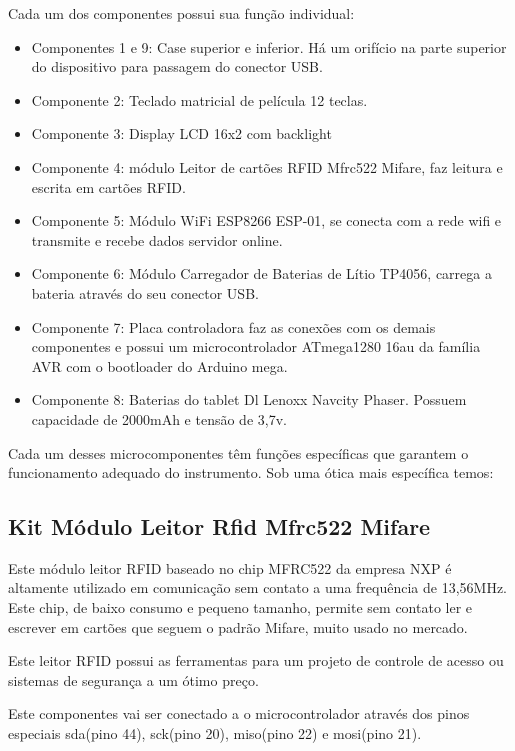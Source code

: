 Cada um dos componentes possui sua função individual:
\begin{itemize}
  \item Componentes 1 e 9: Case superior e inferior. Há um orifício na parte superior do dispositivo para passagem do conector USB.
  \item Componente 2: Teclado matricial de película 12 teclas.
  \item Componente 3: Display LCD 16x2 com backlight
  \item Componente 4: módulo Leitor de cartões RFID Mfrc522 Mifare, faz leitura e escrita em cartões RFID.
  \item Componente 5: Módulo WiFi ESP8266 ESP-01, se conecta com a rede wifi e transmite e recebe dados servidor online.
  \item Componente 6: Módulo Carregador de Baterias de Lítio TP4056, carrega a bateria através do seu conector USB.
  \item Componente 7: Placa controladora faz as conexões com os demais componentes e possui um microcontrolador ATmega1280 16au da família AVR com o bootloader do Arduino mega.
  \item Componente 8: Baterias do tablet Dl Lenoxx Navcity Phaser. Possuem capacidade de 2000mAh e tensão de 3,7v.
\end{itemize}

Cada um desses microcomponentes têm funções específicas que garantem o funcionamento adequado do instrumento. Sob uma ótica mais específica temos:

\subsection{Kit Módulo Leitor Rfid Mfrc522 Mifare}


Este módulo leitor RFID baseado no chip MFRC522 da empresa NXP é altamente utilizado em comunicação sem contato a uma frequência de 13,56MHz. Este chip, de baixo consumo e pequeno tamanho, permite sem contato ler e escrever em cartões que seguem o padrão Mifare, muito usado no mercado.

Este leitor RFID possui as ferramentas para um projeto de controle de acesso ou sistemas de segurança a um ótimo preço.

Este componentes vai ser conectado a o microcontrolador através dos pinos especiais sda(pino 44), sck(pino 20), miso(pino 22) e mosi(pino 21).

